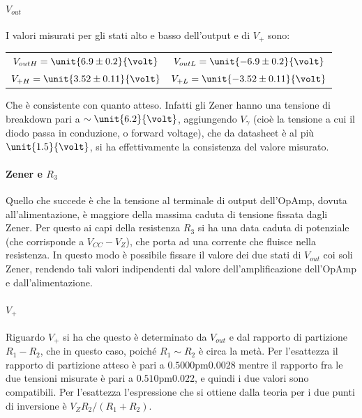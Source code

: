 \documentclass[10pt,a4paper]{article}
\begin{document}
\paragraph{$V_{out}$} I valori misurati per gli stati alto e basso dell'output e di $V_+$ sono:

\begin{table}[H]
	\centering
	\begin{tabular}{cc}
        $ V_{out H} = \unit{6.9 \pm 0.2}{\volt}$  & $V_{out L} = \unit{-6.9 \pm 0.2}{\volt}$\\
        $ V_{+ H} = \unit{3.52 \pm 0.11}{\volt}$  & $V_{+ L} = \unit{-3.52 \pm 0.11}{\volt}$
	\end{tabular}
\end{table}

Che è consistente con quanto atteso. Infatti gli Zener hanno una tensione di breakdown pari a $\sim \unit{6.2}{\volt}$, aggiungendo $V_\gamma$ (cioè la tensione a cui il diodo passa in conduzione, o forward voltage), che da datasheet è al più $\unit{1.5}{\volt}$, si ha effettivamente la consistenza del valore misurato.

\paragraph{Zener e $R_3$} Quello che succede è che la tensione al terminale di output dell'OpAmp, dovuta all'alimentazione, è maggiore della massima caduta di tensione fissata dagli Zener. Per questo ai capi della resistenza $R_3$ si ha una data caduta di potenziale (che corrisponde a $V_{CC}-V_Z$), che porta ad una corrente che fluisce nella resistenza. In questo modo è possibile fissare il valore dei due stati di $V_{out}$ coi soli Zener, rendendo tali valori indipendenti dal valore dell'amplificazione dell'OpAmp e dall'alimentazione.

\paragraph{$V_+$} Riguardo $V_+$ si ha che questo è determinato da $V_{out}$ e dal rapporto di partizione $R_1 - R_2$, che in questo caso, poiché $R_1 \sim R_2$ è circa la metà. Per l'esattezza il rapporto di partizione atteso è pari a $\unit{0.5000 \pm 0.0028}$ mentre il rapporto fra le due tensioni misurate è pari a $\unit{0.510 \pm 0.022}$, e quindi i due valori sono compatibili.
Per l'esattezza l'espressione che si ottiene dalla teoria per i due punti di inversione è $V_Z R_2/(R_1 + R_2)$.
\end{document}
